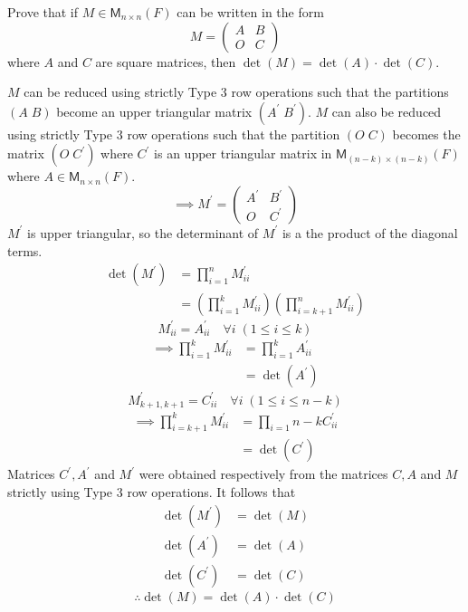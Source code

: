 Prove that if $M\in \mathsf{M}_{n\times n}(F)$ can be written in the
form
\[
M = \begin{pmatrix} A & B\\ O & C
\end{pmatrix}
\]
where $A$ and $C$ are square matrices, then $\det{(M)} =
\det{(A)}\cdot\det{(C)}$.

$M$ can be reduced using strictly Type 3 row operations such that the
partitions $(A\; B)$ become an upper triangular matrix $(A^\prime\; 
B^\prime)$. $M$ can also be reduced using strictly Type 3 row
operations such that the partition $(O\; C)$ becomes the matrix $(O\; 
C^\prime)$ where $C^\prime$ is an upper triangular matrix in
$\mathsf{M}_{(n-k)\times(n-k)}(F)$ where $A \in \mathsf{M}_{n\times
  n}(F)$.
\begin{equation}
\implies M^\prime = \begin{pmatrix}A^\prime & B^\prime \\ O & C^\prime
\end{pmatrix}
\end{equation}
$M^\prime$ is upper triangular, so the determinant of $M^\prime$ is a
the product of the diagonal terms.
\begin{align}
\det{(M^\prime)} &= \prod\limits^{n}_{i=1}M^\prime_{ii}\\
&= \left(\prod\limits^{k}_{i=1}M^\prime_{ii}\right)\left(\prod\limits^{n}_{i=k+1}M^\prime_{ii}\right)
\end{align}
\begin{equation}
M^\prime_{ii} = A^\prime_{ii} \quad \forall i \; (1\leq i\leq k)
\end{equation}
\begin{align}
\implies \prod\limits_{i=1}^k M^\prime_{ii} &= \prod\limits_{i=1}^k
A^\prime_{ii}\\
&= \det{(A^\prime)}
\end{align}
\begin{equation}
M^\prime_{k+1,k+1} = C^\prime_{ii} \quad \forall i \; (1\leq i\leq n-k)
\end{equation}
\begin{align}
\implies \prod\limits_{i=k+1}^k M^\prime_{ii} &= \prod\limits_{i=1}{n-k}
C^\prime_{ii}\\
&= \det{(C^\prime)}
\end{align}
Matrices $C^\prime,A^\prime$ and $M^\prime$ were obtained respectively
from the matrices $C,A$ and $M$ strictly using Type 3 row
operations. It follows that
\begin{align}
\det{(M^\prime)} &= \det{(M)}\\
\det{(A^\prime)} &= \det{(A)}\\
\det{(C^\prime)} &= \det{(C)}
\end{align}
\begin{equation}
\therefore \det{(M)} = \det{(A)} \cdot \det{(C)}
\end{equation}
